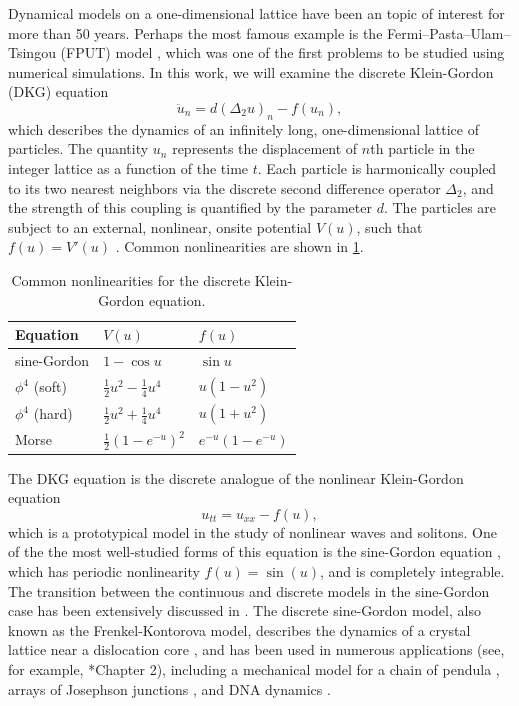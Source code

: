\documentclass[12pt,reqno]{amsart}
\theoremstyle{definition}
\begin{document}
Dynamical models on a one-dimensional lattice have been an topic of interest for more than 50 years. Perhaps the most famous example is the Fermi–Pasta–Ulam–Tsingou (FPUT) model \cites{FPUT,Zabusuy1965}, which was one of the first problems to be studied using numerical simulations. In this work, we will examine the discrete Klein-Gordon (DKG) equation
\begin{equation*}
\ddot{u}_n = d (\Delta_2 u)_n - f(u_n),
\end{equation*}
which describes the dynamics of an infinitely long, one-dimensional lattice of particles. The quantity $u_n$ represents the displacement of $n$th particle in the integer lattice as a function of the time $t$. Each particle is harmonically coupled to its two nearest neighbors via the discrete second difference operator $\Delta_2$, and the strength of this coupling is quantified by the parameter $d$. The particles are subject to an external, nonlinear, onsite potential $V(u)$, such that $f(u) = V'(u)$ \cite{Karachalios}. Common nonlinearities are shown in \cref{table:V}.

\begin{table}
\begin{tabular}{lll}\toprule
Equation & $V(u)$ & $f(u)$ \\ \midrule
sine-Gordon & $1 - \cos u$ & $\sin u$ \\
$\phi^4$ (soft) & $\frac{1}{2}u^2 - \frac{1}{4}u^4$ & $u(1-u^2)$ \\
$\phi^4$ (hard) & $\frac{1}{2}u^2 + \frac{1}{4}u^4$ & $u(1+u^2)$ \\
Morse & $\frac{1}{2}(1 - e^{-u})^2$ & $e^{-u}(1 - e^{-u})$ \\ \bottomrule
\end{tabular}
\caption{Common nonlinearities for the discrete Klein-Gordon equation.}
\label{table:V}
\end{table}

The DKG equation is the discrete analogue of the nonlinear Klein-Gordon equation
\begin{equation*}
u_{tt} = u_{xx} - f(u),
\end{equation*}
which is a prototypical model in the study of nonlinear waves and solitons. One of the the most well-studied forms of this equation is the sine-Gordon equation \cites{braun2004,SGbook,p4book,kivsharmalomed}, which has periodic nonlinearity $f(u)=\sin(u)$, and is completely integrable. The transition between the continuous and discrete models in the sine-Gordon case has been extensively discussed in \cite{SGchapter}. The discrete sine-Gordon model, also known as the Frenkel-Kontorova model, describes the dynamics of a crystal lattice near a dislocation core \cites{braun1998,braun2004}, and has been used in numerous applications (see, for example, \cite{braun2004}*{Chapter 2}), including a mechanical model for a chain of pendula \cites{Scott1969,english}, arrays of Josephson junctions \cites{Ustinov1992,Floria1998}, and DNA dynamics \cites{Yomosa1983,Yakushevich1998,DeLeo2011}.
\end{document}

